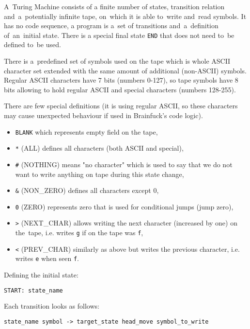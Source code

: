 \documentclass[english,shortabstract,mgr]{iithesis}
\begin{document}
A~Turing Machine consists of a finite number of states, transition relation
and~a~potentially infinite tape, on~which it is able to~write and~read symbols.
It has no code sequence, a program is a~set of transitions and~a~definition
of~an~initial state. There is a special final state \texttt{END} that does not need
to~be defined to~be used.

There is a~predefined set of symbols used on the tape which is whole ASCII character set
extended with the same amount of additional (non-ASCII) symbols. Regular
ASCII characters have 7 bits (numbers 0-127), so tape symbols have 8 bits
allowing to hold regular ASCII and special characters (numbers 128-255).

        There are few special definitions (it is using regular ASCII, so
these characters may cause unexpected behaviour if used in Brainfuck's
code logic).

\begin{itemize}
  \item \texttt{BLANK} which represents empty field on the tape,
  \item \texttt{*} (ALL) defines all characters (both ASCII and special),
  \item \texttt{\#} (NOTHING) means "no character" which is used to say
                   that we do not want to write anything on tape during
                   this state change,
          \item \texttt{\&} (NON\_ZERO) defines all characters except 0,
          \item \texttt{0} (ZERO) represents zero that is used for conditional jumps
           (jump zero),
          \item \texttt{>} (NEXT\_CHAR) allows writing the next character
                   (increased by one) on the~tape, i.e. writes \texttt{g}
                   if on the tape was \texttt{f},
  \item \texttt{<} (PREV\_CHAR) similarly as above but writes the previous character,
                   i.e. writes \texttt{e} when seen \texttt{f}.
\end{itemize}

Defining the initial state:
\begin{verbatim}
START: state_name
\end{verbatim}

Each transition looks as follows:
\begin{verbatim}
state_name symbol -> target_state head_move symbol_to_write
\end{verbatim}
\end{document}
